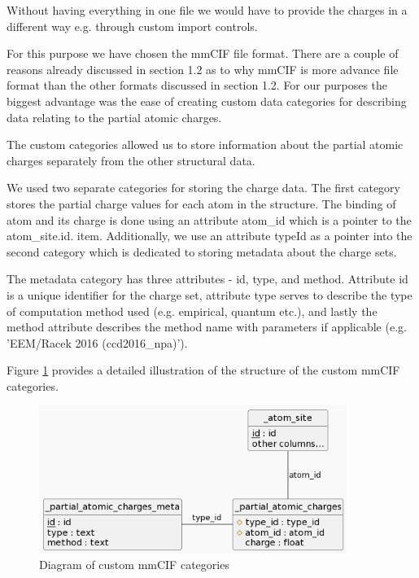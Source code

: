 \documentclass[
  digital,     %
  oneside,     %
  nosansbold,  %
  nocolorbold, %
  lof,         %
  lot,         %
]{fithesis4}
\begin{document}
Without having everything in one file we would have to provide the charges in a different way e.g. through custom import controls.

For this purpose we have chosen the mmCIF file format. There are a couple of reasons already discussed in section 1.2 as to why mmCIF is more advance file format than the other formats discussed in section 1.2. For our purposes the biggest advantage was the ease of creating custom data categories for describing data relating to the partial atomic charges.

The custom categories allowed us to store information about the partial atomic charges separately from the other structural data.

We used two separate categories for storing the charge data.
The first category stores the partial charge values for each atom in the structure. The binding of atom and its charge is done using an attribute atom\_id which is a pointer to the atom\_site.id. item. Additionally, we use an attribute typeId as a pointer into the second category which is dedicated to storing metadata about the charge sets.

The metadata category has three attributes - id, type, and method. Attribute id is a unique identifier for the charge set, attribute type serves to describe the type of computation method used (e.g. empirical, quantum etc.), and lastly the method attribute describes the method name with parameters if applicable (e.g. 'EEM/Racek 2016 (ccd2016\_npa)').

Figure \ref{fig:mmcif_erd} provides a detailed illustration of the structure of the custom mmCIF categories.

\begin{figure}
  \begin{center}
    \includegraphics[width=10cm]{figures/mmcif_erd.png}
  \end{center}
  \caption{Diagram of custom mmCIF categories}
  \label{fig:mmcif_erd}
\end{figure}
\end{document}
